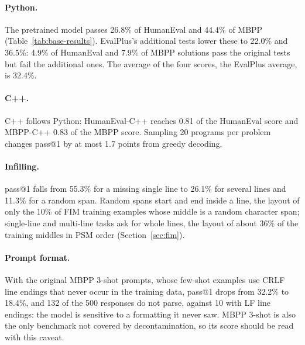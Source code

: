 \documentclass[sigconf,nonacm,balance=false]{acmart}
\begin{document}
\paragraph{Python.} The pretrained model passes 26.8\% of HumanEval and 44.4\% of MBPP (Table~\ref{tab:base-results}).
EvalPlus's additional tests lower these to 22.0\% and 36.5\%: 4.9\% of HumanEval and 7.9\% of MBPP solutions pass the
original tests but fail the additional ones. The average of the four scores, the EvalPlus average, is 32.4\%.

\paragraph{C++.} C++ follows Python: HumanEval-C++ reaches 0.81 of the HumanEval score and MBPP-C++ 0.83 of the MBPP
score. Sampling 20 programs per problem changes pass@1 by at most 1.7 points from greedy decoding.

\paragraph{Infilling.} pass@1 falls from 55.3\% for a missing single line to 26.1\% for several lines and 11.3\% for
a random span. Random spans start and end inside a line, the layout of only the 10\% of FIM training examples whose
middle is a random character span; single-line and multi-line tasks ask for whole lines, the layout of about 36\% of
the training middles in PSM order (Section~\ref{sec:fim}).

\paragraph{Prompt format.} With the original MBPP 3-shot prompts, whose few-shot examples use CRLF line endings that
never occur in the training data, pass@1 drops from 32.2\% to 18.4\%, and 132 of the 500 responses do not parse,
against 10 with LF line endings: the model is sensitive to a formatting it never saw. MBPP 3-shot is also the only
benchmark not covered by decontamination, so its score should be read with this caveat.
\end{document}
